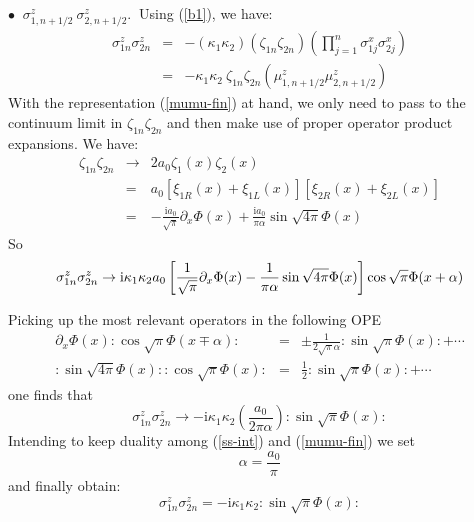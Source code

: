 $\bullet~$ \underline{$\sigma^z _{1,n+1/2}~ \sigma^z _{2,n+1/2}$}.$~$
Using (\ref{b1}), we have:
\begin{eqnarray}
\sigma^z _{1n} \sigma^z _{2n} &=& - \left( \kappa_1 \kappa_2 \right)
\left( \zeta_{1n}\zeta_{2n}\right)
\left( \prod_{j=1}^{n} \sigma^x _{1j} \sigma^x _{2j} \right) 
\nonumber\\
&=& - \kappa_1 \kappa_2~ \zeta_{1n}\zeta_{2n}
\left(\mu^z _{1,n+1/2} \mu^z _{2,n+1/2} \right)
\label{ss-1}
\end{eqnarray}
With the representation (\ref{mumu-fin}) at hand,
we only need to pass to the continuum limit in $\zeta_{1n}\zeta_{2n}$
and then make use of proper operator product expansions. We have:
\begin{eqnarray}
\zeta_{1n}\zeta_{2n} &\rightarrow& 2a_0 \zeta_1 (x) \zeta_2 (x) \nonumber\\
&=& a_0 \left[ \xi_{1R} (x) + \xi_{1L} (x) \right]
\left[ \xi_{2R} (x) + \xi_{2L} (x) \right]\nonumber\\
&=& - \frac{\mbox{i} a_0}{\sqrt{\pi}} \partial_x \Phi (x) + \frac{\mbox{i} a_0}{\pi \alpha}
\sin \sqrt{4\pi} \Phi(x)
\label{zeta-zeta-cont}
\end{eqnarray}
So
\begin{equation}
\sigma^z _{1n} \sigma^z _{2n} \rightarrow \mbox{i} \kappa_1 \kappa_2 a_0
\left[ \frac{1}{\sqrt{\pi}} \partial_x \Phi (x) - \frac{1}{\pi \alpha} \sin \sqrt{4\pi} \Phi(x) \right] \cos \sqrt{\pi}\Phi (x + \alpha )
\end{equation}

Picking up the most relevant operators in the following OPE
\begin{eqnarray}
\partial_x \Phi (x) :\cos \sqrt{\pi} \Phi (x \mp \alpha):
&=& \pm \frac{1}{2\sqrt{\pi} \alpha} :\sin \sqrt{\pi} \Phi (x):
+ \cdots
\label{ope-1}\\
:\sin \sqrt{4 \pi} \Phi (x)::\cos \sqrt{\pi} \Phi (x):
&=& \frac{1}{2} :\sin \sqrt{\pi} \Phi (x): + \cdots
\label{ope-2}
\end{eqnarray}
one finds that
\begin{equation}
\sigma^z _{1n} \sigma^z _{2n} \rightarrow
- \mbox{i} \kappa_1 \kappa_2 \left( \frac{a_0}{2\pi \alpha} \right)
:\sin \sqrt{\pi} \Phi (x):
\label{ss-int}
\end{equation}
Intending to keep duality among (\ref{ss-int}) and (\ref{mumu-fin})
we set
\begin{equation}
\alpha = \frac{a_0}{\pi} \label{alpha-vs-a0}
\end{equation}
and finally obtain:
\begin{equation}
\sigma^z _{1n} \sigma^z _{2n} =
- \mbox{i} \kappa_1 \kappa_2 :\sin \sqrt{\pi} \Phi (x):
\label{ss-fin}
\end{equation}

